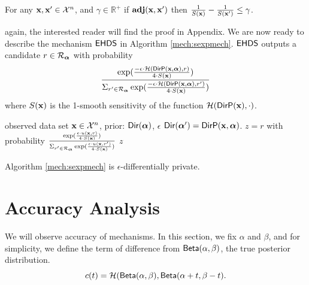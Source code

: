 \documentclass{article}
\begin{document}
\begin{thm}
  \label{thm_gamma_smooth}
  For any $\textbf{x}, \textbf{x}'\in\mathcal{X}^n$, and $\gamma \in \mathbb{R}^{+}$
  if  $\textbf{adj}(\textbf{x},\textbf{x}')$ then $\frac{1}{S(\textbf{x})} - \frac{1}{S(\textbf{x}')} \leq \gamma$.
\end{thm}
again, the interested reader will find the proof in Appendix.
We are now ready to describe the mechanism $\hexpmech$ in Algorithm \ref{mech:sexpmech}. $\hexpmech$ outputs a candidate $r \in \mathcal{R}_{\boldsymbol{\alpha}}$ with probability
\[
 \frac
  {\exp(\frac{-\epsilon\cdot \mathcal{H}(\mathsf{DirP}(\textbf{x},\boldsymbol{\alpha}), r)}{4\cdot S(\textbf{x})})}
{\Sigma_{r' \in \mathcal{R}_{\boldsymbol{\alpha}}}\exp(\frac{-\epsilon\cdot \mathcal{H}(\mathsf{DirP}(\textbf{x},\boldsymbol{\alpha}), r')}{4\cdot S(\textbf{x})})}
\]
where $S(\textbf{x})$ is the 1-smooth sensitivity of  the function $\mathcal{H}(\mathsf{DirP}(\textbf{x}),\cdot)$. {\color{red}{why do we choose 1???}}
  \begin{algorithm}
  \caption{$\hexpmech$}
  \label{mech:sexpmech}
  \begin{algorithmic}
  \INPUT observed data set $\textbf{x} \in \mathcal{X}^n$, prior: $\mathsf{Dir}(\boldsymbol{\alpha})$, $\epsilon$
  \STATE {} $\mathsf{Dir}(\boldsymbol{\alpha}')= \mathsf{DirP}(\textbf{x},\boldsymbol{\alpha})$.   
  \STATE {} $z=r$ with probability $\frac{\exp(\frac{\epsilon\cdot u(\textbf{x}, {r})}{4\cdot S(\textbf{x})})}{\Sigma_{r' \in \mathcal{R}_{\boldsymbol{\alpha}}}\exp(\frac{\epsilon\cdot u(\textbf{x}, r')}{4\cdot S(\textbf{x})})}$
 $z$
  \end{algorithmic}
\end{algorithm}

\begin{thm}
  Algorithm \ref{mech:sexpmech} is $\epsilon$-differentially private.
\end{thm}
\section{Accuracy Analysis}
We will observe accuracy of mechanisms.
In this section, we fix $\alpha$ and $\beta$, and for simplicity, we define the term of difference from $\mathsf{Beta}(\alpha, \beta)$, the true posterior distribution.
\[
c(t) = \mathcal{H}(\mathsf{Beta}(\alpha, \beta), \mathsf{Beta}(\alpha + t, \beta - t).
\]
\end{document}
